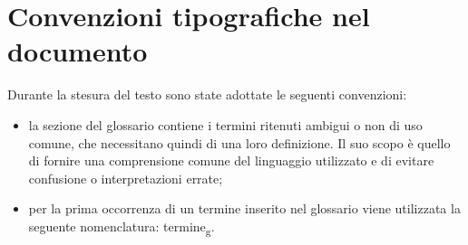 \section{Convenzioni tipografiche nel documento}
Durante la stesura del testo sono state adottate le seguenti convenzioni:
\begin{itemize}
\item la sezione del glossario contiene i termini ritenuti ambigui o non di uso comune, che necessitano quindi di una loro definizione. Il suo scopo è quello di fornire una comprensione comune del linguaggio utilizzato e di evitare confusione o interpretazioni errate;
\item per la prima occorrenza di un termine inserito nel glossario viene utilizzata la seguente nomenclatura: termine\textsubscript{g}.\\
\end{itemize}

